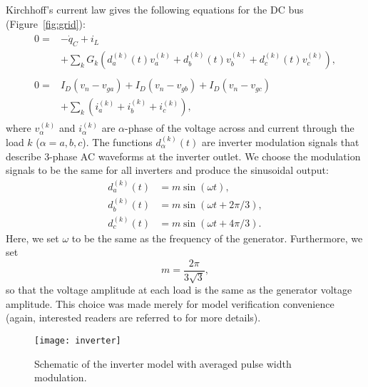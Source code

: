 \documentclass[10pt]{ijnam}
\theoremstyle{definition}
\begin{document}
Kirchhoff's current law gives the following equations for the DC bus (Figure~\ref{fig:grid}):
\begin{align}
    \begin{split}
    0 = {}& -\dot q_C + i_L \\
        & + \sum_k G_k \left(  d^{(k)}_a(t) v^{(k)}_a + d^{(k)}_b(t) v^{(k)}_b + d^{(k)}_c(t) v^{(k)}_c  \right),
    \end{split} \\
    \begin{split}
    0 = {}& I_D(v_n - v_{ga}) + I_D(v_n - v_{gb}) + I_D(v_n - v_{gc}) \\
        &  + \sum_k \left( i^{(k)}_a + i^{(k)}_b + i^{(k)}_c \right),
    \end{split}
\end{align}
where $v^{(k)}_\alpha$ and $i^{(k)}_\alpha$ are $\alpha$-phase of the 
voltage across and current through the load $k$ ($\alpha = a,b,c$).
The functions $d^{(k)}_\alpha(t)$ are inverter modulation signals that
describe 3-phase AC waveforms at the inverter outlet. We choose the modulation 
signals to be the same for all inverters and produce the sinusoidal output:
\begin{align*}
    d^{(k)}_a (t) &= m \sin(\omega t),            \\
    d^{(k)}_b (t) &= m \sin(\omega t + 2\pi / 3), \\
    d^{(k)}_c (t) &= m \sin(\omega t + 4\pi / 3).
\end{align*}
Here, we set $\omega$ to be the same as the frequency of the 
generator. Furthermore, we set
\begin{equation*}
    m = \frac{2\pi}{3\sqrt{3}},
\end{equation*}
so that the voltage amplitude at each load is the same as the generator 
voltage amplitude. This choice was made merely for model verification 
convenience (again, interested readers are referred to \cite{erickson2001} for more details). 

\begin{figure}[htb]
    \centering
    \texttt{[image: inverter]}
    \caption{Schematic of the inverter model with averaged pulse width modulation.}
    \label{fig:inverter_averaged}
\end{figure}
\end{document}
